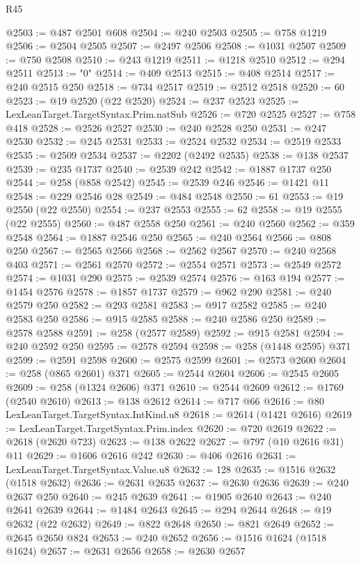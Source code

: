 \begin{lexlean}{R45}
\begin{coremodule}
{@2503 := @487 @2501 @608
@2504 := @240 @2503
@2505 := @758 @1219
@2506 := @2504 @2505
@2507 := @2497 @2506
@2508 := @1031 @2507
@2509 := @750 @2508
@2510 := @243 @1219
@2511 := @1218 @2510
@2512 := @294 @2511
@2513 := "0"
@2514 := @409 @2513
@2515 := @408 @2514
@2517 := @240 @2515 @250
@2518 := @734 @2517
@2519 := @2512 @2518
@2520 := 60
@2523 := @19 @2520 (@22 @2520)
@2524 := @237 @2523
@2525 := LexLeanTarget.TargetSyntax.Prim.natSub
@2526 := @720 @2525
@2527 := @758 @418
@2528 := @2526 @2527
@2530 := @240 @2528 @250
@2531 := @247 @2530
@2532 := @245 @2531
@2533 := @2524 @2532
@2534 := @2519 @2533
@2535 := @2509 @2534
@2537 := @2202 (@2492 @2535)
@2538 := @138 @2537
@2539 := @235 @1737
@2540 := @2539 @242
@2542 := @1887 @1737 @250
@2544 := @258 (@858 @2542)
@2545 := @2539 @246
@2546 := @1421 @11
@2548 := @229 @2546 @28
@2549 := @484 @2548
@2550 := 61
@2553 := @19 @2550 (@22 @2550)
@2554 := @237 @2553
@2555 := 62
@2558 := @19 @2555 (@22 @2555)
@2560 := @487 @2558 @250
@2561 := @240 @2560
@2562 := @359 @2548
@2564 := @1887 @2546 @250
@2565 := @240 @2564
@2566 := @808 @250
@2567 := @2565 @2566
@2568 := @2562 @2567
@2570 := @240 @2568 @403
@2571 := @2561 @2570
@2572 := @2554 @2571
@2573 := @2549 @2572
@2574 := @1031 @290
@2575 := @2539 @2574
@2576 := @163 @194
@2577 := @1454 @2576
@2578 := @1857 @1737
@2579 := @962 @290
@2581 := @240 @2579 @250
@2582 := @293 @2581
@2583 := @917 @2582
@2585 := @240 @2583 @250
@2586 := @915 @2585
@2588 := @240 @2586 @250
@2589 := @2578 @2588
@2591 := @258 (@2577 @2589)
@2592 := @915 @2581
@2594 := @240 @2592 @250
@2595 := @2578 @2594
@2598 := @258 (@1448 @2595) @371
@2599 := @2591 @2598
@2600 := @2575 @2599
@2601 := @2573 @2600
@2604 := @258 (@865 @2601) @371
@2605 := @2544 @2604
@2606 := @2545 @2605
@2609 := @258 (@1324 @2606) @371
@2610 := @2544 @2609
@2612 := @1769 (@2540 @2610)
@2613 := @138 @2612
@2614 := @717 @66
@2616 := @80 LexLeanTarget.TargetSyntax.IntKind.u8
@2618 := @2614 (@1421 @2616)
@2619 := LexLeanTarget.TargetSyntax.Prim.index
@2620 := @720 @2619
@2622 := @2618 (@2620 @723)
@2623 := @138 @2622
@2627 := @797 (@10 @2616 @31) @11
@2629 := @1606 @2616 @242
@2630 := @406 @2616
@2631 := LexLeanTarget.TargetSyntax.Value.u8
@2632 := 128
@2635 := @1516 @2632 (@1518 @2632)
@2636 := @2631 @2635
@2637 := @2630 @2636
@2639 := @240 @2637 @250
@2640 := @245 @2639
@2641 := @1905 @2640
@2643 := @240 @2641 @2639
@2644 := @1484 @2643
@2645 := @294 @2644
@2648 := @19 @2632 (@22 @2632)
@2649 := @822 @2648
@2650 := @821 @2649
@2652 := @2645 @2650 @824
@2653 := @240 @2652
@2656 := @1516 @1624 (@1518 @1624)
@2657 := @2631 @2656
@2658 := @2630 @2657
}
\end{coremodule}
\end{lexlean}
